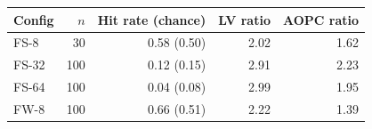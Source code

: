 \begin{tabular}{lrrrr}
\toprule
Config & $n$ & Hit rate (chance) & LV ratio & AOPC ratio \\
\midrule
FS-8 & 30 & 0.58 (0.50) & 2.02 & 1.62 \\
FS-32 & 100 & 0.12 (0.15) & 2.91 & 2.23 \\
FS-64 & 100 & 0.04 (0.08) & 2.99 & 1.95 \\
FW-8 & 100 & 0.66 (0.51) & 2.22 & 1.39 \\
\bottomrule
\end{tabular}

